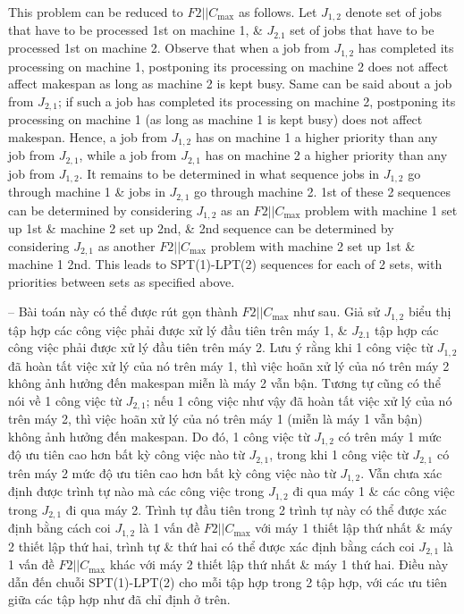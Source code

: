 \documentclass{article}
\begin{document}
\begin{itemize}
\begin{itemize}
        This problem can be reduced to $F2|| C_{\max}$ as follows. Let $J_{1,2}$ denote set of jobs that have to be processed 1st on machine 1, \& $J_{2.1}$ set of jobs that have to be processed 1st on machine 2. Observe that when a job from $J_{1,2}$ has completed its processing on machine 1, postponing its processing on machine 2 does not affect affect makespan as long as machine 2 is kept busy. Same can be said about a job from $J_{2,1}$; if such a job has completed its processing on machine 2, postponing its processing on machine 1 (as long as machine 1 is kept busy) does not affect makespan. Hence, a job from $J_{1,2}$ has on machine 1 a higher priority than any job from $J_{2,1}$, while a job from $J_{2,1}$ has on machine 2 a higher priority than any job from $J_{1,2}$. It remains to be determined in what sequence jobs in $J_{1,2}$ go through machine 1 \& jobs in $J_{2,1}$ go through machine 2. 1st of these 2 sequences can be determined by considering $J_{1,2}$ as an $F2||C_{\max}$ problem with machine 1 set up 1st \& machine 2 set up 2nd, \& 2nd sequence can be determined by considering $J_{2,1}$ as another $F2||C_{\max}$ problem with machine 2 set up 1st \& machine 1 2nd. This leads to SPT(1)-LPT(2) sequences for each of 2 sets, with priorities between sets as specified above.

        -- Bài toán này có thể được rút gọn thành $F2|| C_{\max}$ như sau. Giả sử $J_{1,2}$ biểu thị tập hợp các công việc phải được xử lý đầu tiên trên máy 1, \& $J_{2.1}$ tập hợp các công việc phải được xử lý đầu tiên trên máy 2. Lưu ý rằng khi 1 công việc từ $J_{1,2}$ đã hoàn tất việc xử lý của nó trên máy 1, thì việc hoãn xử lý của nó trên máy 2 không ảnh hưởng đến makespan miễn là máy 2 vẫn bận. Tương tự cũng có thể nói về 1 công việc từ $J_{2,1}$; nếu 1 công việc như vậy đã hoàn tất việc xử lý của nó trên máy 2, thì việc hoãn xử lý của nó trên máy 1 (miễn là máy 1 vẫn bận) không ảnh hưởng đến makespan. Do đó, 1 công việc từ $J_{1,2}$ có trên máy 1 mức độ ưu tiên cao hơn bất kỳ công việc nào từ $J_{2,1}$, trong khi 1 công việc từ $J_{2,1}$ có trên máy 2 mức độ ưu tiên cao hơn bất kỳ công việc nào từ $J_{1,2}$. Vẫn chưa xác định được trình tự nào mà các công việc trong $J_{1,2}$ đi qua máy 1 \& các công việc trong $J_{2,1}$ đi qua máy 2. Trình tự đầu tiên trong 2 trình tự này có thể được xác định bằng cách coi $J_{1,2}$ là 1 vấn đề $F2||C_{\max}$ với máy 1 thiết lập thứ nhất \& máy 2 thiết lập thứ hai, trình tự \& thứ hai có thể được xác định bằng cách coi $J_{2,1}$ là 1 vấn đề $F2||C_{\max}$ khác với máy 2 thiết lập thứ nhất \& máy 1 thứ hai. Điều này dẫn đến chuỗi SPT(1)-LPT(2) cho mỗi tập hợp trong 2 tập hợp, với các ưu tiên giữa các tập hợp như đã chỉ định ở trên.


\end{itemize}
\end{itemize}
\end{document}
